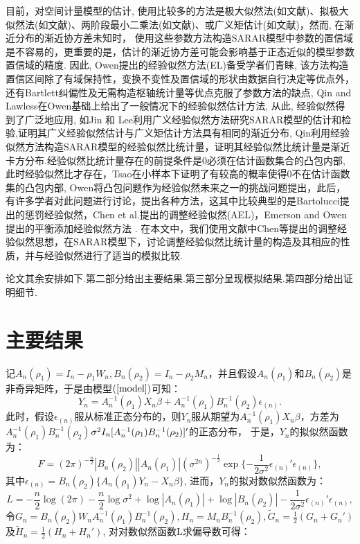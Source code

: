 \documentclass[a4paper,c5size,onecolumn,twoside,cap,Chinese]{APSart}
\begin{document}
目前，对空间计量模型的估计, 使用比较多的方法是极大似然法(如文献)、拟极大似然法(如文献)、两阶段最小二乘法(如文献)、或广义矩估计(如文献)，然而, 在渐近分布的渐近协方差未知时， 使用这些参数方法构造SARAR模型中参数的置信域是不容易的，更重要的是，估计的渐近协方差可能会影响基于正态近似的模型参数置信域的精度. 因此, Owen提出的经验似然方法(EL)备受学者们青睐, 该方法构造置信区间除了有域保持性，变换不变性及置信域的形状由数据自行决定等优点外，还有Bartlett纠偏性及无需构造枢轴统计量等优点克服了参数方法的缺点, Qin and Lawless在Owen基础上给出了一般情况下的经验似然估计方法, 从此, 经验似然得到了广泛地应用, 如Jin 和 Lee利用广义经验似然方法研究SARAR模型的估计和检验,证明其广义经验似然估计与广义矩估计方法具有相同的渐近分布, Qin利用经验似然方法构造SARAR模型的经验似然比统计量，证明其经验似然比统计量是渐近卡方分布.经验似然比统计量存在的前提条件是0必须在估计函数集合的凸包内部, 此时经验似然比才存在，Tsao在小样本下证明了有较高的概率使得0不在估计函数集的凸包内部, Owen将凸包问题作为经验似然未来之一的挑战问题提出，此后，有许多学者对此问题进行讨论，提出各种方法，这其中比较典型的是Bartolucci提出的惩罚经验似然，Chen et al.提出的调整经验似然(AEL)，Emerson and Owen提出的平衡添加经验似然方法 . 在本文中，我们使用文献中Chen等提出的调整经验似然思想，在SARAR模型下，讨论调整经验似然比统计量的构造及其相应的性质，并与经验似然进行了适当的模拟比较.  

论文其余安排如下.第二部分给出主要结果.第三部分呈现模拟结果.第四部分给出证明细节.

\section{主要结果}

记$A_n(\rho_1)=I_n-\rho_1W_n,B_n(\rho_2)=I_n-\rho_2M_n$，并且假设$A_n(\rho_1)$和$B_n(\rho_2)$是非奇异矩阵，于是由模型$\rm(\ref{model}) $可知：
$$
Y_{n} =A_n^{-1}(\rho_1)X_n\beta+A_n^{-1}(\rho_1)B_n^{-1}(\rho_2)\epsilon_{(n)}. 
$$
此时，假设$\epsilon_{(n)}$服从标准正态分布的，则$Y_{n}$服从期望为$A_n^{-1}(\rho_1)X_n\beta$，方差为$A_n^{-1}(\rho_1)B_n^{-1}(\rho_2)$$\\ \sigma^2 I_n[A_n^{-1}(\rho_1)B_n^{-1}(\rho_2)]'$的正态分布，
于是，$Y_{n}$的拟似然函数为：
$$
F =(2\pi)^{-\frac{n}{2}}|B_n(\rho_2)||A_n(\rho_1)|(\sigma^{2n})^{-\frac{1}{2}}\exp\{-\frac{1}{2\sigma^{2}}\epsilon_{(n)}'\epsilon_{(n)}\},
$$
其中$\epsilon_{(n)}=B_n(\rho_2)\{A_n(\rho_1)Y_{n}-X_n\beta  \}$,
进而，$Y_{n}$的拟对数似然函数为：
$$
L =-\frac{n}{2}\log(2\pi) -\frac{n}{2}\log\sigma^{2}+\log|A_n(\rho_1)|+\log|B_n(\rho_2)|-\frac{1}{2\sigma^{2}}\epsilon_{(n)}'\epsilon_{(n)},
$$
令$G_n=B_n (\rho_2 ) W_n A_n^{-1} (\rho_1 ) B_n^{-1} (\rho_2 ),H_n=M_n B_n^{-1} (\rho_2),\tilde{G}_n=\frac{1}{2} (G_n+G_n' )$及$\tilde{H}_n=\frac{1}{2} (H_n+H_n' )$, 对对数似然函数L求偏导数可得：
\end{document}
